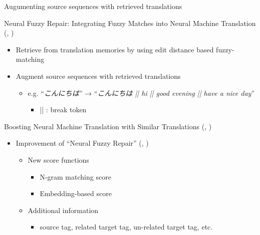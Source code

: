 \documentclass[unicode, 12pt, xdvipdfmx, aspectratio=169]{beamer}
\newcommand{\mycite}[1]{{\scriptsize\reffont({\citeauthor*{#1}, \citeyear{#1}})}}
\begin{document}
\begin{frame}[label={sec:orge8cb6c3}]{Augumenting source sequences with retrieved translations}
\vspace{-0.3cm}
\begin{block}{\footnotesize Neural Fuzzy Repair: Integrating Fuzzy Matches into Neural Machine Translation \mycite{bulte-tezcan-2019-neural}}
\vspace{-0.1cm}
\begin{itemize}
\item Retrieve from translation memories by using edit distance based fuzzy-matching
\item Augment source sequences with retrieved translations
\begin{itemize}
\item e.g. ``\textit{こんにちは}'' → ``\textit{こんにちは || hi || good evening || have a nice day}''
\begin{itemize}
\item || : break token
\end{itemize}
\end{itemize}
\end{itemize}

\vspace{-0.3cm}
\end{block}
\begin{block}{\small Boosting Neural Machine Translation with Similar Translations \mycite{xu-etal-2020-boosting}}
\vspace{-0.1cm}
\begin{itemize}
\item Improvement of ``Neural Fuzzy Repair'' \mycite{bulte-tezcan-2019-neural}
\begin{itemize}
\item New score functions
\begin{itemize}
\item N-gram matching score
\item Embedding-based score
\end{itemize}
\item Additional information
\begin{itemize}
\item source tag, related target tag, un-related target tag, etc.
\end{itemize}
\end{itemize}
\end{itemize}
\end{block}
\end{frame}
\end{document}
